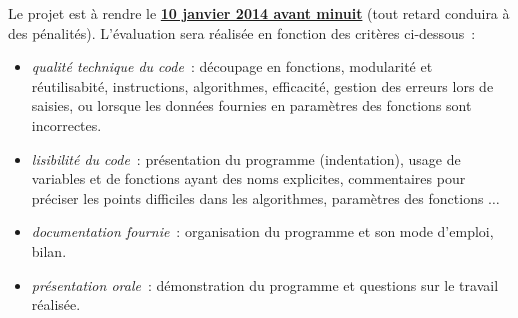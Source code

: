 \documentclass[10pt]{article}
\begin{document}
Le projet est à rendre le \underline{\bf 10 janvier 2014 avant minuit} 
(tout retard conduira à des pénalités). L'évaluation sera réalisée en fonction 
des critères ci-dessous~:
\begin{itemize}

\item \textit{qualité technique du code}~: découpage en fonctions, modularité et réutilisabité, instructions, algorithmes, efficacité, gestion des erreurs lors de saisies, ou lorsque les données fournies en paramètres des fonctions sont incorrectes.

\item \textit{lisibilité du code}~: présentation du programme (indentation), usage de variables et de fonctions ayant des noms explicites, commentaires pour préciser les points difficiles dans les algorithmes, paramètres des fonctions $\ldots$ 

\item \textit{documentation fournie}~: organisation du programme et son mode d'emploi, bilan.

\item \textit{présentation orale}~: démonstration du programme et questions sur le travail réalisée.

\end{itemize}
\end{document}
